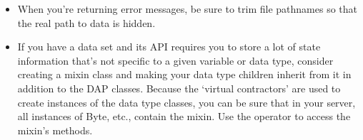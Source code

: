 \documentclass{dods-paper}
\begin{document}
\begin{itemize}
\item When you're returning error messages, be sure to trim file pathnames so
  that the real path to data is hidden.

\item If you have a data set and its API requires you to store a lot of state
  information that's not specific to a given variable or data type, consider
  creating a mixin class and making your data type children inherit from it in
  addition to the DAP classes. Because the `virtual contractors' are used to
  create instances of the data type classes, you can be sure that in your
  server, all instances of Byte, etc., contain the mixin. Use the
   operator to access the mixin's methods.

\end{itemize}

   
\end{document}
